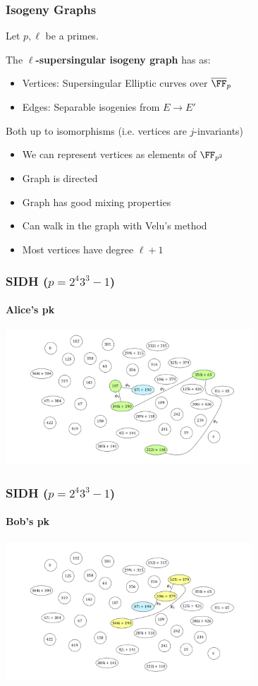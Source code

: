 \documentclass{beamer}
\begin{document}
\begin{frame}
    \frametitle{Isogeny Graphs}
    Let $p, \ell$ be a primes.
    \begin{definition}
        The $\ell$\textbf{-supersingular isogeny graph} has as:
        \begin{itemize}
            \item Vertices: Supersingular Elliptic curves over $\overline{\FF}_p$
            \item Edges: Separable isogenies from $E \to E'$
        \end{itemize}
        Both up to isomorphisms (i.e. vertices are $j$-invariants)
    \end{definition}
    \begin{itemize}
        \item We can represent vertices as elements of $\FF_{p^2}$
        \item Graph is directed
        \item Graph has good mixing properties
        \item Can walk in the graph with Velu's method
        \item Most vertices have degree $\ell + 1$
    \end{itemize} 

\end{frame}

\begin{frame}
    \frametitle{SIDH ($p = 2^4 3^3 - 1$)}
    \framesubtitle{Alice's pk}
    \begin{center}
        \includegraphics[width=25em]{alice_pk.PNG}
    \end{center}
\end{frame}

\begin{frame}
    \frametitle{SIDH ($p = 2^4 3^3 - 1$)}
    \framesubtitle{Bob's pk}
    \begin{center}
        \includegraphics[width=25em]{bob_pk.PNG}
    \end{center}
\end{frame}
\end{document}
